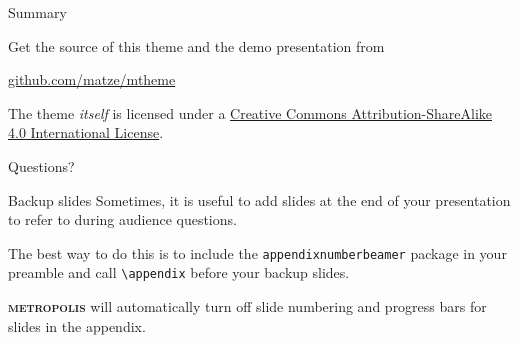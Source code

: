\documentclass[10pt]{beamer}
\newcommand{\themename}{\textbf{\textsc{metropolis}}\xspace}
\begin{document}
\begin{frame}{Summary}

  Get the source of this theme and the demo presentation from

  \begin{center}\url{github.com/matze/mtheme}\end{center}

  The theme \emph{itself} is licensed under a
  \href{http://creativecommons.org/licenses/by-sa/4.0/}{Creative Commons
  Attribution-ShareAlike 4.0 International License}.

  \begin{center}\ccbysa\end{center}

\end{frame}

{
\begin{frame}[standout]
  Questions?
\end{frame}
}

\appendix

\begin{frame}[fragile]{Backup slides}
  Sometimes, it is useful to add slides at the end of your presentation to
  refer to during audience questions.

  The best way to do this is to include the \verb|appendixnumberbeamer|
  package in your preamble and call \verb|\appendix| before your backup slides.

  \themename will automatically turn off slide numbering and progress bars for
  slides in the appendix.
\end{frame}
\end{document}
